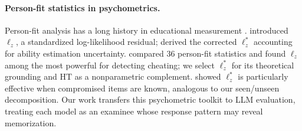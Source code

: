 \paragraph{Person-fit statistics in psychometrics.}
Person-fit analysis has a long history in educational measurement \citep[see][]{embretson2000}.
\citet{drasgow1985} introduced $\ell_z$, a standardized log-likelihood residual; \citet{snijders2001} derived the corrected $\ell_z^*$ accounting for ability estimation uncertainty.
\citet{karabatsos2003} compared 36 person-fit statistics and found $\ell_z$ among the most powerful for detecting cheating; we select $\ell_z^*$ for its theoretical grounding and HT \citep{vanderflier1982} as a nonparametric complement.
\citet{sinharay2017} showed $\ell_z^*$ is particularly effective when compromised items are known, analogous to our seen/unseen decomposition.
Our work transfers this psychometric toolkit to LLM evaluation, treating each model as an examinee whose response pattern may reveal memorization.

